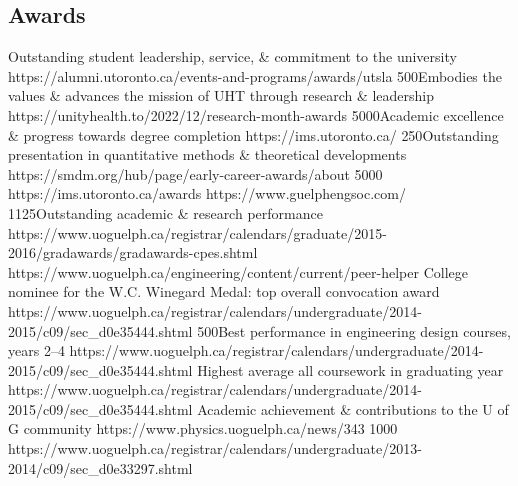 \subsection{Awards}
  {}{Outstanding student leadership, service, \& commitment to the university}
  {https://alumni.utoronto.ca/events-and-programs/awards/utsla}
  {500}{Embodies the values \& advances the mission of UHT through research \& leadership}
  {https://unityhealth.to/2022/12/research-month-awards}
  {5000}{Academic excellence \& progress towards degree completion}
  {https://ims.utoronto.ca/}
  {250}{Outstanding presentation in quantitative methods \& theoretical developments}
  {https://smdm.org/hub/page/early-career-awards/about}
  {5000}{}
  {https://ims.utoronto.ca/awards}
  {}{}
  {https://www.guelphengsoc.com/}
  {1125}{Outstanding academic \& research performance}
  {https://www.uoguelph.ca/registrar/calendars/graduate/2015-2016/gradawards/gradawards-cpes.shtml}
  {}{}
  {https://www.uoguelph.ca/engineering/content/current/peer-helper}
  {}{College nominee for the W.C. Winegard Medal: top overall convocation award}
  {https://www.uoguelph.ca/registrar/calendars/undergraduate/2014-2015/c09/sec_d0e35444.shtml}
  {500}{Best performance in engineering design courses, years 2--4}
  {https://www.uoguelph.ca/registrar/calendars/undergraduate/2014-2015/c09/sec_d0e35444.shtml}
  {}{Highest average all coursework in graduating year}
  {https://www.uoguelph.ca/registrar/calendars/undergraduate/2014-2015/c09/sec_d0e35444.shtml}
  {}{Academic achievement \& contributions to the U of G community}
  {https://www.physics.uoguelph.ca/news/343}
  {1000}{}
  {https://www.uoguelph.ca/registrar/calendars/undergraduate/2013-2014/c09/sec_d0e33297.shtml}
